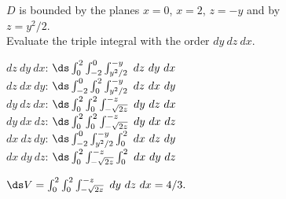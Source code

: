 {$D$ is bounded by the planes $x=0$, $x=2$,  $z=-y$ and by\\
 $z=y^2/2$.\\

Evaluate the triple integral with the order $dy\ dz\ dx$.

}
{$dz\ dy\ dx$: $\ds\int_0^2\int_{-2}^{0}\int_{y^2/2}^{-y}\ dz\ dy\ dx$\\
	$dz\ dx\ dy$: $\ds\int_{-2}^0\int_0^{2}\int_{y^2/2}^{-y}\ dz\ dx\ dy$\\
	$dy\ dz\ dx$: $\ds\int_0^2\int_0^{2}\int_{-\sqrt{2z}}^{-z}\ dy\ dz\ dx$\\
	$dy\ dx\ dz$: $\ds\int_0^2\int_0^{2}\int_{-\sqrt{2z}}^{-z}\ dy\ dx\ dz$\\
	$dx\ dz\ dy$: $\ds\int_{-2}^0\int_{y^2/2}^{-y}\int_0^{2}\ dx\ dz\ dy$\\
	$dx\ dy\ dz$: $\ds\int_0^2\int_{-\sqrt{2z}}^{-z}\int_0^{2}\ dx\ dy\ dz$
	
	 $\ds V = \int_0^2\int_0^{2}\int_{-\sqrt{2z}}^{-z}\ dy\ dz\ dx =4/3.$
}
